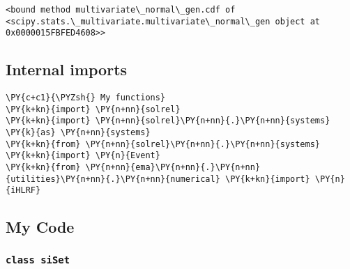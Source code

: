             \begin{tcolorbox}[breakable, size=fbox, boxrule=.5pt, pad at break*=1mm, opacityfill=0]
\begin{Verbatim}[commandchars=\\\{\}]
<bound method multivariate\_normal\_gen.cdf of
<scipy.stats.\_multivariate.multivariate\_normal\_gen object at
0x0000015FBFED4608>>
\end{Verbatim}
\end{tcolorbox}
        
    \hypertarget{internal-imports}{%
\subsection{Internal imports}\label{internal-imports}}

    \begin{tcolorbox}[breakable, size=fbox, boxrule=1pt, pad at break*=1mm,colback=cellbackground, colframe=cellborder]
\begin{Verbatim}[commandchars=\\\{\}]
\PY{c+c1}{\PYZsh{} My functions}
\PY{k+kn}{import} \PY{n+nn}{solrel}
\PY{k+kn}{import} \PY{n+nn}{solrel}\PY{n+nn}{.}\PY{n+nn}{systems} \PY{k}{as} \PY{n+nn}{systems}
\PY{k+kn}{from} \PY{n+nn}{solrel}\PY{n+nn}{.}\PY{n+nn}{systems} \PY{k+kn}{import} \PY{n}{Event}
\PY{k+kn}{from} \PY{n+nn}{ema}\PY{n+nn}{.}\PY{n+nn}{utilities}\PY{n+nn}{.}\PY{n+nn}{numerical} \PY{k+kn}{import} \PY{n}{iHLRF}
\end{Verbatim}
\end{tcolorbox}

    \hypertarget{my-code}{%
\subsection{My Code}\label{my-code}}

    \hypertarget{class-siset}{%
\subsubsection{\texorpdfstring{\texttt{class\ siSet}}{class siSet}}\label{class-siset}}

